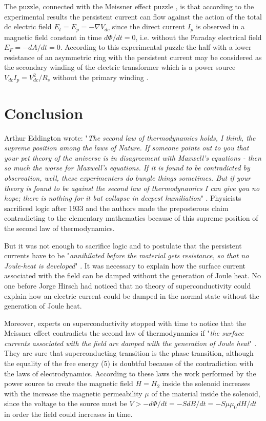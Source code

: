 \documentclass[twocolumn,secnumarabic,amssymb, nobibnotes, aps, prd]{revtex4}
\begin{document}
The puzzle, connected with the Meissner effect puzzle \cite{Hirsch10Meis}, is that according to the experimental results \cite{Physica2019,PLA2012Ex,Letter2007,JETP2007,Letter2003,Physica1967,NANO2002,APL2016,Kulik75} the persistent current can flow against the action of the total dc electric field $E_{t} = E_{p} =  -\nabla V_{dc}$ \cite{Physica2019,QuanStud2016} since the direct current $I_{p}$ is observed in a magnetic field constant in time $d\Phi /dt = 0$, i.e. without the Faraday electrical field $E_{F} = - dA/dt = 0$. According to this experimental puzzle the half with a lower resistance of an asymmetric ring with the persistent current may be considered as the secondary winding of the electric transformer which is a power source $V_{dc}I_{p} = V_{dc}^{2}/R_{s}$ without the primary winding \cite{Physica2019}.

\section{Conclusion}
Arthur Eddington wrote: "{\it The second law of thermodynamics holds, I think, the supreme position among the laws of Nature. If someone points out to you that your pet theory of the universe is in disagreement with Maxwell's equations - then so much the worse for Maxwell's equations. If it is found to be contradicted by observation, well, these experimenters do bungle things sometimes. But if your theory is found to be against the second law of thermodynamics I can give you no hope; there is nothing for it but collapse in deepest humiliation}" \cite{Eddington}. Physicists sacrificed logic after 1933 and the authors \cite{Science2009PC,Birge2009} made the preposterous claim contradicting to the elementary mathematics because of this supreme position of the second law of thermodynamics. 

But it was not enough to sacrifice logic and to postulate that the persistent currents have to be "{\it annihilated before the material gets resistance, so that no Joule-heat is developed}" \cite{Keesom1934}. It was necessary to explain how the surface current associated with the field can be damped without the generation of Joule heat. No one before Jorge Hirsch \cite{Hirsch2020Physica,Hirsch2020EPL,Hirsch2020ModPhys} had noticed that no theory of superconductivity could explain how an electric current could be damped in the normal state without the generation of Joule heat. 

Moreover, experts on superconductivity stopped with time to notice that the Meissner effect contradicts the second law of thermodynamics if "{\it the surface currents associated with the field are damped with the generation of Joule heat}" \cite{Shoenberg1952}. They are sure that superconducting transition is the phase transition, although the equality of the free energy (5) is doubtful because of the contradiction with the laws of electrodynamics. According to these laws the work performed by the power source to create the magnetic field $H = H_{2}$ inside the solenoid increases with the increase the magnetic permeability $\mu $ of the material inside the solenoid, since the voltage to the source must be $V > -d\Phi /dt = -SdB/dt = -S\mu \mu _{0}dH/dt$ in order the field could increases in time. 
\end{document}
